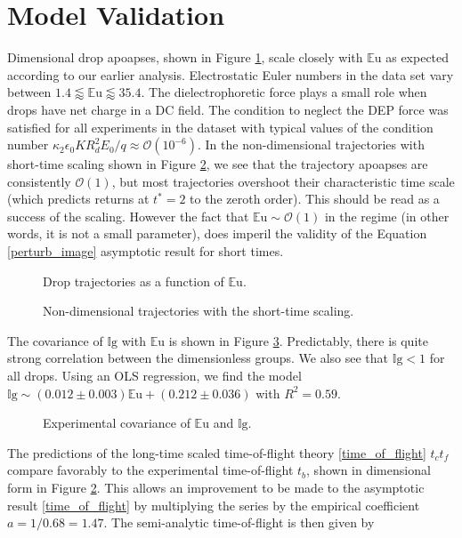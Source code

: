 \documentclass[12pt,a4paper,oneside]{book}
\begin{document}
\section{Model Validation}
Dimensional drop apoapses, shown in Figure \ref{fig:series_s_eu}, scale closely with $\mathbb{E}\mbox{u}$ as expected according to our earlier analysis. Electrostatic Euler numbers in the data set vary between $1.4 \lessapprox \mathbb{E}\mbox{u} \lessapprox 35.4$. The dielectrophoretic force plays a small role when drops have net charge in a DC field. The condition to neglect the DEP force was satisfied for all experiments in the dataset with typical values of the condition number $\kappa_2 \epsilon_0 K R_d^2 E_0/q \approx \mathcal{O}(10^{-6})$. In the non-dimensional trajectories with short-time scaling shown in Figure \ref{fig:series_s_ds}, we see that the trajectory apoapses are consistently $\mathcal{O}(1)$, but most trajectories overshoot their characteristic time scale (which predicts returns at $t^*  =2$ to the zeroth order). This should be read as a success of the scaling. However the fact that $\mathbb{E}\mbox{u} \sim \mathcal{O}(1)$ in the regime (in other words, it is not a small parameter), does imperil the validity of the Equation \ref{perturb_image} asymptotic result for short times.
\begin{figure}[!htb]
    \centering
    
    \caption{Drop trajectories as a function of $\mathbb{E}\mbox{u}$.\label{fig:series_s_eu}}
\end{figure}
\begin{figure}[htb]
    \centering
    
    \caption{Non-dimensional trajectories with the short-time scaling.\label{fig:series_s_ds}}
\end{figure}
The covariance of $\mathbb{I}\mbox{g}$ with $\mathbb{E}\mbox{u}$ is shown in Figure \ref{fig:dnumbs}. Predictably, there is quite strong correlation between the dimensionless groups. We also see that $\mathbb{I}\mbox{g} < 1$ for all drops. Using an OLS regression, we find the model $\mathbb{I}\mbox{g} \sim (0.012 \pm 0.003) \mathbb{E}\mbox{u} + (0.212 \pm 0.036) $ with $R^2 =0.59$.
\begin{figure}[htb]
    \centering
    
    \caption{Experimental covariance of $\mathbb{E}\mbox{u}$ and $\mathbb{I}\mbox{g}$.\label{fig:dnumbs}}
\end{figure}
The predictions of the long-time scaled time-of-flight theory \ref{time_of_flight} $t_c t_f$ compare favorably to the experimental time-of-flight $t_b$, shown in dimensional form in Figure \ref{fig:series_s_ds}. This allows an improvement to be made to the asymptotic result \ref{time_of_flight} by multiplying the series by the empirical coefficient $a = 1/0.68 = 1.47$. The semi-analytic time-of-flight is then given by
\end{document}

